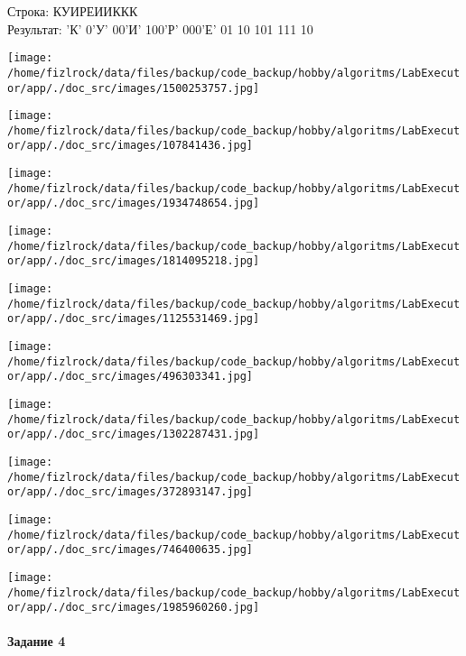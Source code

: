 \documentclass[a4paper, 12pt]{article}
\begin{document}
Строка: 
КУИРЕИИККК\\
Результат: 'К' 0'У' 00'И' 100'Р' 000'Е' 01 10 101 111 10

\texttt{[image: /home/fizlrock/data/files/backup/code\_backup/hobby/algoritms/LabExecutor/app/./doc\_src/images/1500253757.jpg]}

\texttt{[image: /home/fizlrock/data/files/backup/code\_backup/hobby/algoritms/LabExecutor/app/./doc\_src/images/107841436.jpg]}

\texttt{[image: /home/fizlrock/data/files/backup/code\_backup/hobby/algoritms/LabExecutor/app/./doc\_src/images/1934748654.jpg]}

\texttt{[image: /home/fizlrock/data/files/backup/code\_backup/hobby/algoritms/LabExecutor/app/./doc\_src/images/1814095218.jpg]}

\texttt{[image: /home/fizlrock/data/files/backup/code\_backup/hobby/algoritms/LabExecutor/app/./doc\_src/images/1125531469.jpg]}

\texttt{[image: /home/fizlrock/data/files/backup/code\_backup/hobby/algoritms/LabExecutor/app/./doc\_src/images/496303341.jpg]}

\texttt{[image: /home/fizlrock/data/files/backup/code\_backup/hobby/algoritms/LabExecutor/app/./doc\_src/images/1302287431.jpg]}

\texttt{[image: /home/fizlrock/data/files/backup/code\_backup/hobby/algoritms/LabExecutor/app/./doc\_src/images/372893147.jpg]}

\texttt{[image: /home/fizlrock/data/files/backup/code\_backup/hobby/algoritms/LabExecutor/app/./doc\_src/images/746400635.jpg]}

\texttt{[image: /home/fizlrock/data/files/backup/code\_backup/hobby/algoritms/LabExecutor/app/./doc\_src/images/1985960260.jpg]}
\pagebreak
\paragraph{Задание 4}
\end{document}
